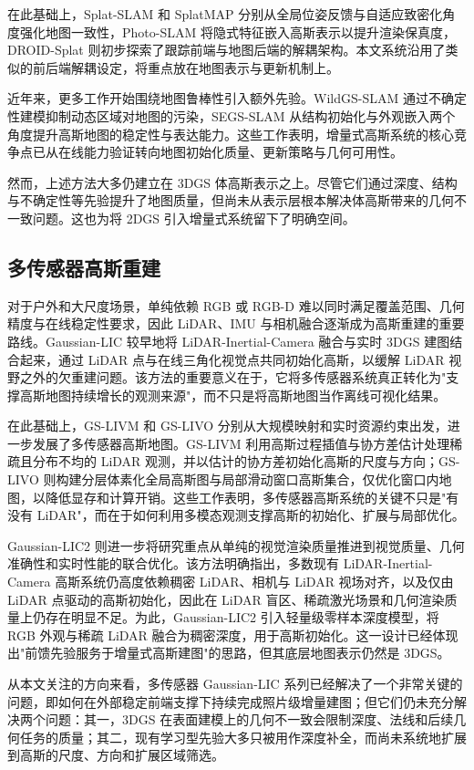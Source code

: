 在此基础上，Splat-SLAM 和 SplatMAP 分别从全局位姿反馈与自适应致密化角度强化地图一致性，Photo-SLAM 将隐式特征嵌入高斯表示以提升渲染保真度，DROID-Splat 则初步探索了跟踪前端与地图后端的解耦架构。本文系统沿用了类似的前后端解耦设定，将重点放在地图表示与更新机制上。

近年来，更多工作开始围绕地图鲁棒性引入额外先验。WildGS-SLAM 通过不确定性建模抑制动态区域对地图的污染，SEGS-SLAM 从结构初始化与外观嵌入两个角度提升高斯地图的稳定性与表达能力。这些工作表明，增量式高斯系统的核心竞争点已从在线能力验证转向地图初始化质量、更新策略与几何可用性。

然而，上述方法大多仍建立在 3DGS 体高斯表示之上。尽管它们通过深度、结构与不确定性等先验提升了地图质量，但尚未从表示层根本解决体高斯带来的几何不一致问题。这也为将 2DGS 引入增量式系统留下了明确空间。

\subsection{多传感器高斯重建}

对于户外和大尺度场景，单纯依赖 RGB 或 RGB-D 难以同时满足覆盖范围、几何精度与在线稳定性要求，因此 LiDAR、IMU 与相机融合逐渐成为高斯重建的重要路线。Gaussian-LIC 较早地将 LiDAR-Inertial-Camera 融合与实时 3DGS 建图结合起来，通过 LiDAR 点与在线三角化视觉点共同初始化高斯，以缓解 LiDAR 视野之外的欠重建问题。该方法的重要意义在于，它将多传感器系统真正转化为"支撑高斯地图持续增长的观测来源"，而不只是将高斯地图当作离线可视化结果。

在此基础上，GS-LIVM 和 GS-LIVO 分别从大规模映射和实时资源约束出发，进一步发展了多传感器高斯地图。GS-LIVM 利用高斯过程插值与协方差估计处理稀疏且分布不均的 LiDAR 观测，并以估计的协方差初始化高斯的尺度与方向；GS-LIVO 则构建分层体素化全局高斯图与局部滑动窗口高斯集合，仅优化窗口内地图，以降低显存和计算开销。这些工作表明，多传感器高斯系统的关键不只是"有没有 LiDAR"，而在于如何利用多模态观测支撑高斯的初始化、扩展与局部优化。

Gaussian-LIC2 则进一步将研究重点从单纯的视觉渲染质量推进到视觉质量、几何准确性和实时性能的联合优化。该方法明确指出，多数现有 LiDAR-Inertial-Camera 高斯系统仍高度依赖稠密 LiDAR、相机与 LiDAR 视场对齐，以及仅由 LiDAR 点驱动的高斯初始化，因此在 LiDAR 盲区、稀疏激光场景和几何渲染质量上仍存在明显不足。为此，Gaussian-LIC2 引入轻量级零样本深度模型，将 RGB 外观与稀疏 LiDAR 融合为稠密深度，用于高斯初始化。这一设计已经体现出"前馈先验服务于增量式高斯建图"的思路，但其底层地图表示仍然是 3DGS。

从本文关注的方向来看，多传感器 Gaussian-LIC 系列已经解决了一个非常关键的问题，即如何在外部稳定前端支撑下持续完成照片级增量建图；但它们仍未充分解决两个问题：其一，3DGS 在表面建模上的几何不一致会限制深度、法线和后续几何任务的质量；其二，现有学习型先验大多只被用作深度补全，而尚未系统地扩展到高斯的尺度、方向和扩展区域筛选。
